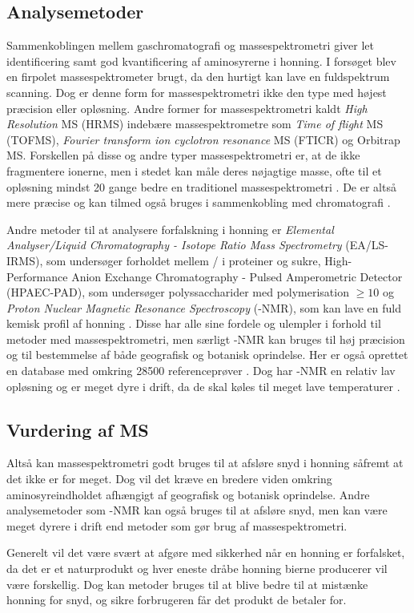 \subsection{Analysemetoder}
Sammenkoblingen mellem gaschromatografi og massespektrometri giver let identificering samt god kvantificering af aminosyrerne i honning.
I forsøget blev en firpolet massespektrometer brugt, da den hurtigt kan lave en fuldspektrum scanning.
Dog er denne form for massespektrometri ikke den type med højest præcision eller opløsning.
Andre former for massespektrometri kaldt \emph{High Resolution} MS (HRMS) indebære massespektrometre som \emph{Time of flight} MS (TOFMS), \emph{Fourier transform ion cyclotron resonance} MS (FTICR) og Orbitrap MS.
Forskellen på disse og andre typer massespektrometri er, at de ikke fragmentere ionerne, men i stedet kan måle deres nøjagtige masse, ofte til et opløsning mindst \num{20} gange bedre en traditionel massespektrometri \parencite{tandemMS}.
De er altså mere præcise og kan tilmed også bruges i sammenkobling med chromatografi \parencite{mstextbook}.
\par Andre metoder til at analysere forfalskning i honning er \emph{Elemental Analyser/Liquid Chromatography - Isotope Ratio Mass Spectrometry} (EA/LS-IRMS),
som undersøger forholdet mellem / i proteiner og sukre, High-Performance Anion Exchange Chromatography - Pulsed Amperometric Detector (HPAEC-PAD),
som undersøger polyssaccharider med polymerisation $\geq 10$ og \emph{Proton Nuclear Magnetic Resonance Spectroscopy} (-NMR), som kan lave en fuld kemisk profil af honning \parencite{EUhoney}.
Disse har alle sine fordele og ulempler i forhold til metoder med massespektrometri, men særligt -NMR kan bruges til høj præcision og til bestemmelse af både geografisk og botanisk oprindelse.
Her er også oprettet en database med omkring \num{28500} referenceprøver \parencite{HNMRbruker}.
Dog har -NMR en relativ lav opløsning og er meget dyre i drift, da de skal køles til meget lave temperaturer \parencite{advHNMR}.
\subsection{Vurdering af MS}
Altså kan massespektrometri godt bruges til at afsløre snyd i honning såfremt at det ikke er for meget.
Dog vil det kræve en bredere viden omkring aminosyreindholdet afhængigt af geografisk og botanisk oprindelse.
Andre analysemetoder som -NMR kan også bruges til at afsløre snyd, men kan være meget dyrere i drift end metoder som gør brug af massespektrometri.
\par Generelt vil det være svært at afgøre med sikkerhed når en honning er forfalsket, da det er et naturprodukt og hver eneste dråbe honning bierne producerer vil være forskellig.
Dog kan metoder bruges til at blive bedre til at mistænke honning for snyd, og sikre forbrugeren får det produkt de betaler for.
